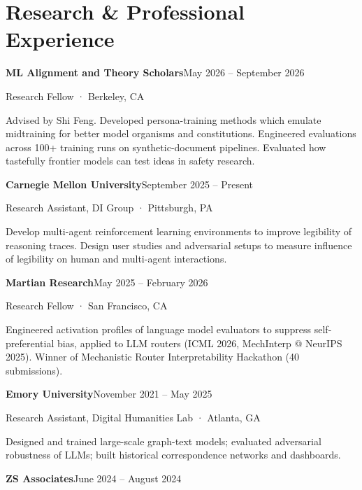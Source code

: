 \documentclass[10pt,letterpaper]{article}
\begin{document}
\section*{Research \& Professional Experience}
\textbf{ML Alignment and Theory Scholars}\hfill {\small\sffamily May 2026 – September 2026}\par
{\small\sffamily\color{muted}Research Fellow · Berkeley, CA}\par
Advised by Shi Feng. Developed persona-training methods which emulate midtraining for better model organisms and constitutions. Engineered evaluations across 100+ training runs on synthetic-document pipelines. Evaluated how tastefully frontier models can test ideas in safety research.\par\vspace{3pt}
\textbf{Carnegie Mellon University}\hfill {\small\sffamily September 2025 – Present}\par
{\small\sffamily\color{muted}Research Assistant, DI Group · Pittsburgh, PA}\par
Develop multi-agent reinforcement learning environments to improve legibility of reasoning traces. Design user studies and adversarial setups to measure influence of legibility on human and multi-agent interactions.\par\vspace{3pt}
\textbf{Martian Research}\hfill {\small\sffamily May 2025 – February 2026}\par
{\small\sffamily\color{muted}Research Fellow · San Francisco, CA}\par
Engineered activation profiles of language model evaluators to suppress self-preferential bias, applied to LLM routers (ICML 2026, MechInterp @ NeurIPS 2025). Winner of Mechanistic Router Interpretability Hackathon (40 submissions).\par\vspace{3pt}
\textbf{Emory University}\hfill {\small\sffamily November 2021 – May 2025}\par
{\small\sffamily\color{muted}Research Assistant, Digital Humanities Lab · Atlanta, GA}\par
Designed and trained large-scale graph-text models; evaluated adversarial robustness of LLMs; built historical correspondence networks and dashboards.\par\vspace{3pt}
\textbf{ZS Associates}\hfill {\small\sffamily June 2024 – August 2024}\par
\end{document}
